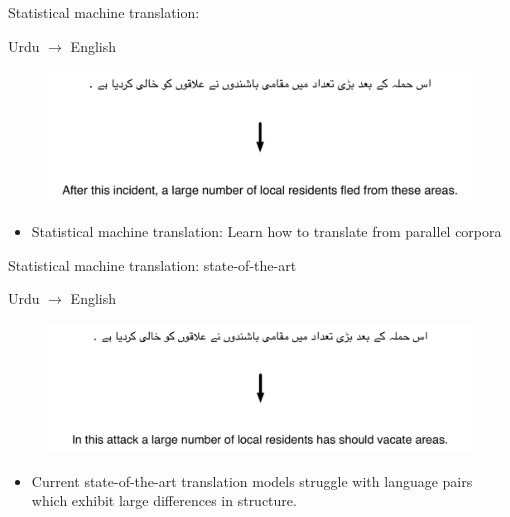 \documentclass{beamer}
\begin{document}
\begin{frame}[t]{Statistical machine translation: }
\begin{exampleblock}{Urdu $\rightarrow$ English}
  \begin{figure}
    {\centering \includegraphics[scale=0.55]{urdu-ref.pdf}}
  \end{figure}
\end{exampleblock}
\begin{itemize}
  \item Statistical machine translation: Learn how to translate from parallel corpora 
\end{itemize}
\end{frame}

\begin{frame}[t]{Statistical machine translation: state-of-the-art}
\begin{exampleblock}{Urdu $\rightarrow$ English}
  \begin{figure}
    {\centering \includegraphics[scale=0.55]{urdu-bl.pdf}}
  \end{figure}
\end{exampleblock}
\begin{itemize}
  \item Current state-of-the-art translation models struggle with language pairs which exhibit large differences in structure.
\end{itemize}
\end{frame}
\end{document}
